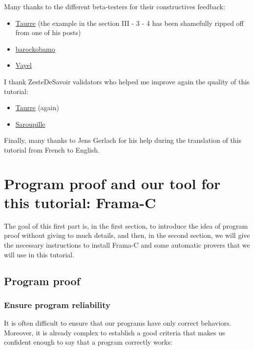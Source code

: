 \documentclass[12pt,francais,]{scrbook}
\newenvironment{zdsblock}[1]{%
  \tcolorbox[beamer,%
    noparskip,breakable,
    colback=LightBlue,colframe=DarkBlue,%
    colbacklower=DarkBlue,%
    title=#1]
}{\endtcolorbox}
\begin{document}
\begin{zdsblock}{Information}
  Many thanks to the different beta-testers for their constructives
  feedback:
  \begin{itemize}
  \item \href{https://zestedesavoir.com/membres/voir/Taurre/}{Taurre} (the
    example in the section III - 3 - 4 has been shamefully ripped
    off from one of his posts)
  \item \href{https://zestedesavoir.com/membres/voir/barockobamo/}{barockobamo}
  \item \href{https://zestedesavoir.com/membres/voir/Vayel/}{Vayel}
  \end{itemize}
  I thank ZesteDeSavoir validators who helped me improve again the quality of
  this tutorial:
  \begin{itemize}
  \item \href{https://zestedesavoir.com/membres/voir/Taurre/}{Taurre} (again)
  \item \href{https://zestedesavoir.com/membres/voir/Saroupille/}{Saroupille}
  \end{itemize}
  Finally, many thanks to Jens Gerlach for his help during the translation of
  this tutorial from French to English.
\end{zdsblock}

\chapter{Program proof and our tool for this tutorial:
Frama-C}\label{program-proof-and-our-tool-for-this-tutorial-frama-c}

The goal of this first part is, in the first section, to introduce the
idea of program proof without giving to much details, and then, in the
second section, we will give the necessary instructions to install
Frama-C and some automatic provers that we will use in this tutorial.

\section{Program proof}\label{program-proof}

\subsection{Ensure program
reliability}\label{ensure-program-reliability}

It is often difficult to ensure that our programs have only correct
behaviors. Moreover, it is already complex to establish a good criteria
that makes us confident enough to say that a program correctly works:
\end{document}
